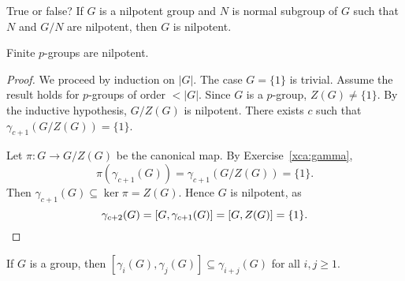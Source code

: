 
\begin{exercise}
   True or false? If $G$ is a nilpotent group and $N$ is normal 
   subgroup of $G$ such that $N$ and $G/N$ are nilpotent, then 
   $G$ is nilpotent. 
\end{exercise}


\begin{proposition}
\label{pro:nilpotent_pgroups}
Finite $p$-groups are nilpotent.
\end{proposition}

\begin{proof}
We proceed by induction on $|G|$. The case $G=\{1\}$ is trivial. 
Assume the result holds for $p$-groups of order $<|G|$. Since 
$G$ is a $p$-group, $Z(G)\ne\{1\}$. By the inductive hypothesis, 
$G/Z(G)$ is nilpotent. There exists $c$ such that 
$\gamma_{c+1}(G/Z(G))=\{1\}$. 
	
Let $\pi\colon G\to G/Z(G)$ be the canonical map.  
By Exercise~\ref{xca:gamma},
\[
\pi(\gamma_{c+1}(G))=\gamma_{c+1}(G/Z(G))=\{1\}. 
\]
Then $\gamma_{c+1}(G)\subseteq \ker\pi=Z(G)$. Hence
$G$ is nilpotent, as 
\[	
\gamma_{c+2}(G)=[G,\gamma_{c+1}(G)]=[G,Z(G)]=\{1\}.\qedhere
\]
\end{proof}

\begin{theorem}
\label{thm:gamma}
If $G$ is a group, then $[\gamma_i(G),\gamma_j(G)]\subseteq
\gamma_{i+j}(G)$ for all $i,j\geq1$.	
\end{theorem}

